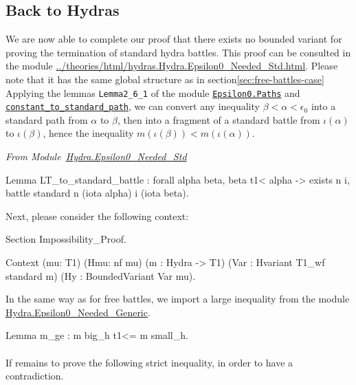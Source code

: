 \subsection{Back to Hydras}
\label{sec:standard-battles-cases}
We are now able to complete our proof that there exists no bounded variant for proving the termination of standard hydra battles. This proof can
be consulted in the module 
\url{../theories/html/hydras.Hydra.Epsilon0_Needed_Std.html}.
Please note that it has the same global structure as in section\ref{sec:free-battles-case} 
Applying the  lemmas  \texttt{Lemma2\_6\_1} of the module 
\href{../theories/html/hydras.Epsilon0.Paths.html\#Lemma2_6_1}%
{\texttt{Epsilon0.Paths}}   and 
\href{../theories/html/hydras.Epsilon0.Paths.html\#constant_to_standard_path}%
{\texttt{constant\_to\_standard\_path}},
we can convert any inequality $\beta<\alpha<\epsilon_0$ into a standard path from
$\alpha$ to  $\beta$, then into a fragment of a standard battle from 
$\iota(\alpha)$ to $\iota(\beta)$, hence the inequality $m(\iota(\beta))<m(\iota(\alpha))$.


\vspace{4pt}
\emph{From Module~\href{../theories/html/hydras.Hydra.Epsilon0_Needed_Std.html\#LT_to_standard_battle}{Hydra.Epsilon0\_Needed\_Std}}

\begin{Coqsrc}
Lemma LT_to_standard_battle :
    forall alpha beta,
      beta t1< alpha ->
      exists n i,  battle standard  n (iota alpha) i (iota beta).
\end{Coqsrc}


Next, please consider the following context:

\begin{Coqsrc}
Section Impossibility_Proof.

Context (mu: T1)
          (Hmu: nf mu)
          (m : Hydra -> T1)
          (Var : Hvariant  T1_wf standard m)
          (Hy : BoundedVariant Var mu).
 \end{Coqsrc}

In the same way as for free battles, we import a large inequality 
from 
the module \href{../theories/html/hydras.Hydra.Epsilon0_Needed_Generic.html}{Hydra.Epsilon0\_Needed\_Generic}.


\begin{Coqsrc}
 Lemma m_ge : m big_h t1<= m small_h.
\end{Coqsrc}

\paragraph*{} If remains to prove the following strict inequality, in order to have a contradiction.

